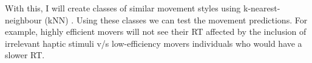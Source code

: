 \documentclass{article}
\begin{document}
\begin{enumerate}
    With this, I will create classes of similar movement styles using k-nearest-neighbour (kNN) \citep{Miller2020}. Using these classes we can test the movement predictions. For example, highly efficient movers will not see their RT affected by the inclusion of irrelevant haptic stimuli v/s low-efficiency movers individuals who would have a slower RT. 
\end{enumerate}



\end{document}
